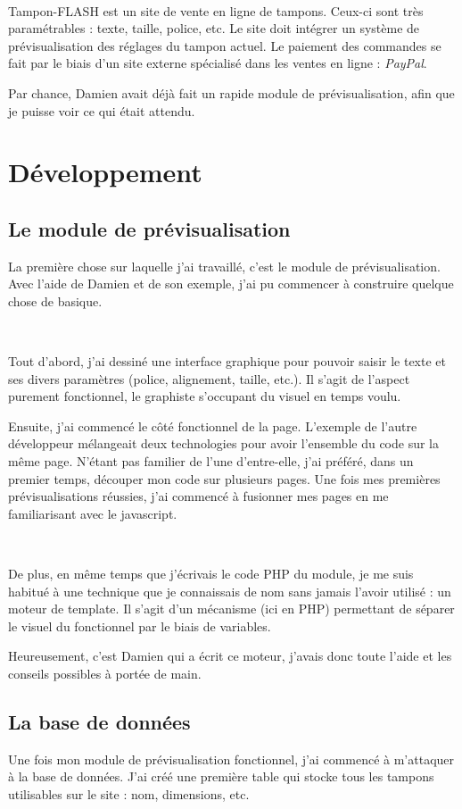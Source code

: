 ~

Tampon-FLASH est un site de vente en ligne de tampons. Ceux-ci sont très paramétrables : texte, taille, police, etc. Le site doit intégrer un système de prévisualisation des réglages du tampon actuel. Le paiement des commandes se fait par le biais d'un site externe spécialisé dans les ventes en ligne : \emph{PayPal}.

Par chance, Damien avait déjà fait un rapide module de prévisualisation, afin que je puisse voir ce qui était attendu.

\section{Développement}
\subsection{Le module de prévisualisation}
La première chose sur laquelle j'ai travaillé, c'est le module de prévisualisation. Avec l'aide de Damien et de son exemple, j'ai pu commencer à construire quelque chose de basique.

~

Tout d'abord, j'ai \og dessiné \fg{} une interface graphique pour pouvoir saisir le texte et ses divers paramètres (police, alignement, taille, etc.). Il s'agit de l'aspect purement fonctionnel, le graphiste s'occupant du visuel en temps voulu.

Ensuite, j'ai commencé le côté fonctionnel de la page. L'exemple de l'autre développeur mélangeait deux technologies pour avoir l'ensemble du code sur la même page. N'étant pas familier de l'une d'entre-elle, j'ai préféré, dans un premier temps, découper mon code sur plusieurs pages. Une fois mes premières prévisualisations réussies, j'ai commencé à fusionner mes pages en me familiarisant avec le javascript.

~

De plus, en même temps que j'écrivais le code PHP du module, je me suis habitué à une technique que je connaissais de nom sans jamais l'avoir utilisé : un moteur de template. Il s'agit d'un mécanisme (ici en PHP) permettant de séparer le visuel du fonctionnel par le biais de variables.

Heureusement, c'est Damien qui a écrit ce moteur, j'avais donc toute l'aide et les conseils possibles à portée de main.

\subsection{La base de données}
Une fois mon module de prévisualisation fonctionnel, j'ai commencé à m'attaquer à la base de données. J'ai créé une première table qui stocke tous les tampons utilisables sur le site : nom, dimensions, etc.


